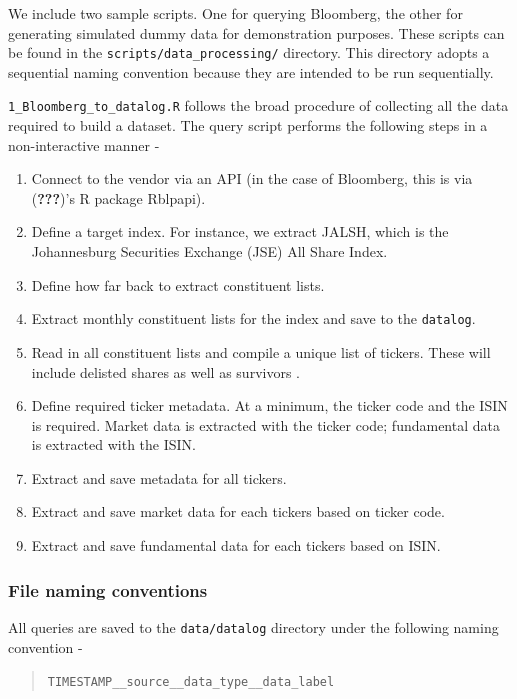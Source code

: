 \documentclass[11pt,preprint, authoryear]{elsarticle}
\numberwithin{equation}{section}
\numberwithin{figure}{section}
\numberwithin{table}{section}
\def\tightlist{} %
\begin{document}
We include two sample scripts. One for querying Bloomberg, the other for
generating simulated dummy data for demonstration purposes. These
scripts can be found in the \texttt{scripts/data\_processing/}
directory. This directory adopts a sequential naming convention because
they are intended to be run sequentially.

\texttt{1\_Bloomberg\_to\_datalog.R} follows the broad procedure of
collecting all the data required to build a dataset. The query script
performs the following steps in a non-interactive manner -

\begin{enumerate}
\def\labelenumi{\arabic{enumi}.}
\tightlist
\item
  Connect to the vendor via an API (in the case of Bloomberg, this is
  via ({\textbf{???}})'s R package Rblpapi).
\item
  Define a target index. For instance, we extract JALSH, which is the
  Johannesburg Securities Exchange (JSE) All Share Index.
\item
  Define how far back to extract constituent lists.
\item
  Extract monthly constituent lists for the index and save to the
  \texttt{datalog}.
\item
  Read in all constituent lists and compile a unique list of tickers.
  These will include delisted shares as well as survivors .
\item
  Define required ticker metadata. At a minimum, the ticker code and the
  ISIN is required. Market data is extracted with the ticker code;
  fundamental data is extracted with the ISIN.
\item
  Extract and save metadata for all tickers.
\item
  Extract and save market data for each tickers based on ticker code.
\item
  Extract and save fundamental data for each tickers based on ISIN.
\end{enumerate}

\subsubsection{File naming conventions}\label{file-naming-conventions}

All queries are saved to the \texttt{data/datalog} directory under the
following naming convention -

\begin{quote}
\texttt{TIMESTAMP\_\_source\_\_data\_type\_\_data\_label}
\end{quote}
\end{document}
